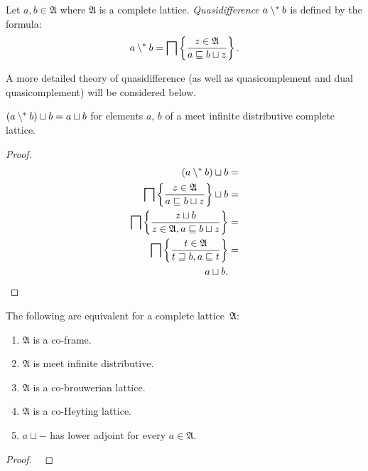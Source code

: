 \begin{defn}
Let $a,b\in\mathfrak{A}$ where $\mathfrak{A}$
is a complete lattice. \emph{Quasidifference} $a\setminus^{\ast} b$ is
defined by the formula:
\[
a\setminus^{\ast} b=\bigsqcap\left\{ \frac{z\in\mathfrak{A}}{a\sqsubseteq b\sqcup z}\right\}.
\]
\end{defn}
\begin{rem}
A more detailed theory of quasidifference (as well as quasicomplement
and dual quasicomplement) will be considered below.\end{rem}
\begin{lem}
$(a\setminus^{\ast} b)\sqcup b=a\sqcup b$ for elements $a$, $b$ of a
meet infinite distributive complete lattice.\end{lem}
\begin{proof}
~
\begin{align*}
(a\setminus^{\ast} b)\sqcup b & =\\
\bigsqcap\left\{ \frac{z\in\mathfrak{A}}{a\sqsubseteq b\sqcup z}\right\}\sqcup b & =\\
\bigsqcap\left\{ \frac{z\sqcup b}{z\in\mathfrak{A},a\sqsubseteq b\sqcup z}\right\} & =\\
\bigsqcap\left\{ \frac{t\in\mathfrak{A}}{t\sqsupseteq b,a\sqsubseteq t}\right\} & =\\
a\sqcup b.
\end{align*}
\end{proof}
\begin{thm}
\label{brow-crit}The following are equivalent for a complete lattice~$\mathfrak{A}$:
\begin{enumerate}
\item \label{cobrow-cnd-frame}$\mathfrak{A}$ is a co-frame.
\item \label{cobrow-cnd-dist}$\mathfrak{A}$ is meet infinite distributive.
\item \label{cobrow-cnd-cobrow}$\mathfrak{A}$ is a co-brouwerian lattice.
\item \label{cobrow-cnd-cohey}$\mathfrak{A}$ is a co-Heyting lattice.
\item \label{cobrow-cnd-adj}$a\sqcup\mathord-$ has lower adjoint for every
$a\in\mathfrak{A}$.
\end{enumerate}
\end{thm}
\begin{proof}
~\end{proof}
